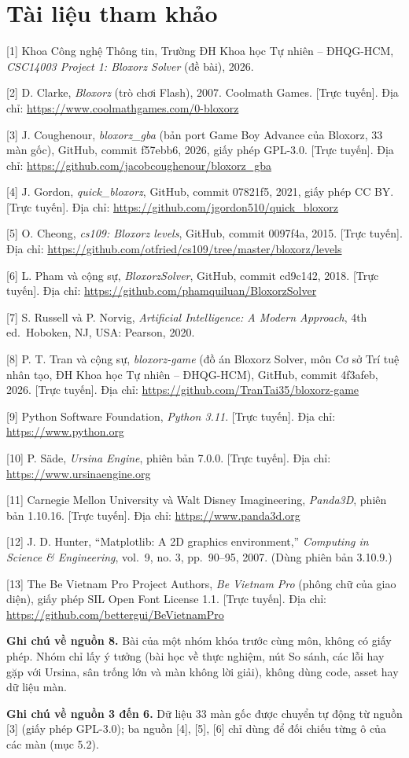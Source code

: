 \section{Tài liệu tham khảo}

{[}1{]} Khoa Công nghệ Thông tin, Trường ĐH Khoa học Tự nhiên -- ĐHQG-HCM, \emph{CSC14003 Project 1: Bloxorz Solver} (đề bài), 2026.

{[}2{]} D. Clarke, \emph{Bloxorz} (trò chơi Flash), 2007. Coolmath Games. {[}Trực tuyến{]}. Địa chỉ: \url{https://www.coolmathgames.com/0-bloxorz}

{[}3{]} J. Coughenour, \emph{bloxorz\_gba} (bản port Game Boy Advance của Bloxorz, 33 màn gốc), GitHub, commit f57ebb6, 2026, giấy phép GPL-3.0. {[}Trực tuyến{]}. Địa chỉ: \url{https://github.com/jacobcoughenour/bloxorz_gba}

{[}4{]} J. Gordon, \emph{quick\_bloxorz}, GitHub, commit 07821f5, 2021, giấy phép CC BY. {[}Trực tuyến{]}. Địa chỉ: \url{https://github.com/jgordon510/quick_bloxorz}

{[}5{]} O. Cheong, \emph{cs109: Bloxorz levels}, GitHub, commit 0097f4a, 2015. {[}Trực tuyến{]}. Địa chỉ: \url{https://github.com/otfried/cs109/tree/master/bloxorz/levels}

{[}6{]} L. Pham và cộng sự, \emph{BloxorzSolver}, GitHub, commit cd9c142, 2018. {[}Trực tuyến{]}. Địa chỉ: \url{https://github.com/phamquiluan/BloxorzSolver}

{[}7{]} S. Russell và P. Norvig, \emph{Artificial Intelligence: A Modern Approach}, 4th ed.~Hoboken, NJ, USA: Pearson, 2020.

{[}8{]} P. T. Tran và cộng sự, \emph{bloxorz-game} (đồ án Bloxorz Solver, môn Cơ sở Trí tuệ nhân tạo, ĐH Khoa học Tự nhiên -- ĐHQG-HCM), GitHub, commit 4f3afeb, 2026. {[}Trực tuyến{]}. Địa chỉ: \url{https://github.com/TranTai35/bloxorz-game}

{[}9{]} Python Software Foundation, \emph{Python 3.11}. {[}Trực tuyến{]}. Địa chỉ: \url{https://www.python.org}

{[}10{]} P. Säde, \emph{Ursina Engine}, phiên bản 7.0.0. {[}Trực tuyến{]}. Địa chỉ: \url{https://www.ursinaengine.org}

{[}11{]} Carnegie Mellon University và Walt Disney Imagineering, \emph{Panda3D}, phiên bản 1.10.16. {[}Trực tuyến{]}. Địa chỉ: \url{https://www.panda3d.org}

{[}12{]} J. D. Hunter, ``Matplotlib: A 2D graphics environment,'' \emph{Computing in Science \& Engineering}, vol.~9, no. 3, pp.~90--95, 2007. (Dùng phiên bản 3.10.9.)

{[}13{]} The Be Vietnam Pro Project Authors, \emph{Be Vietnam Pro} (phông chữ của giao diện), giấy phép SIL Open Font License 1.1. {[}Trực tuyến{]}. Địa chỉ: \url{https://github.com/bettergui/BeVietnamPro}

\textbf{Ghi chú về nguồn 8.} Bài của một nhóm khóa trước cùng môn, không có giấy phép. Nhóm chỉ lấy ý tưởng (bài học về thực nghiệm, nút So sánh, các lỗi hay gặp với Ursina, sân trống lớn và màn không lời giải), không dùng code, asset hay dữ liệu màn.

\textbf{Ghi chú về nguồn 3 đến 6.} Dữ liệu 33 màn gốc được chuyển tự động từ nguồn {[}3{]} (giấy phép GPL-3.0); ba nguồn {[}4{]}, {[}5{]}, {[}6{]} chỉ dùng để đối chiếu từng ô của các màn (mục 5.2).
